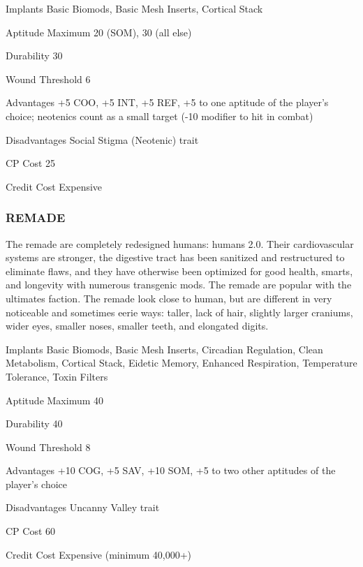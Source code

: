 \begin{description*}
\item[Implants] Basic Biomods, Basic Mesh Inserts, Cortical Stack 
\item[Aptitude Maximum] 20 (SOM), 30 (all else) 
\item[Durability] 30 
\item[Wound Threshold] 6 
\item[Advantages] +5 COO, +5 INT, +5 REF, +5 to one aptitude of the player’s choice; neotenics count as a small target (-10 modifier to hit in combat) 
\item[Disadvantages] Social Stigma (Neotenic) trait 
\item[CP Cost] 25 
\item[Credit Cost] Expensive 
\end{description*}

\subsubsection{REMADE}
The remade are completely redesigned humans: humans 2.0. Their cardiovascular
systems are stronger, the digestive tract has been sanitized and restructured
to eliminate flaws, and they have otherwise been optimized for good health,
smarts, and longevity with numerous transgenic mods. The remade are popular
with the ultimates faction. The remade look close to human, but are different
in very noticeable and sometimes eerie ways: taller, lack of hair, slightly
larger craniums, wider eyes, smaller noses, smaller teeth, and elongated
digits.

\begin{description*}
\item[Implants] Basic Biomods, Basic Mesh Inserts, Circadian Regulation, Clean
  Metabolism, Cortical Stack, Eidetic Memory, Enhanced Respiration, Temperature
  Tolerance, Toxin Filters
\item[Aptitude Maximum] 40 
\item[Durability] 40 
\item[Wound Threshold] 8 
\item[Advantages] +10 COG, +5 SAV, +10 SOM, +5 to two other aptitudes of the
  player’s choice
\item[Disadvantages] Uncanny Valley trait 
\item[CP Cost] 60 
\item[Credit Cost] Expensive (minimum 40,000+) 
\end{description*}


